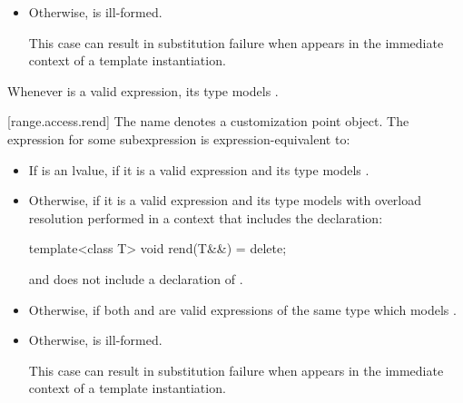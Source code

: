 \begin{addedblock}
\begin{itemize}
\item
  Otherwise,  is ill-formed.
  {\color{newclr}
  \begin{note}
  This case can result in substitution failure when 
  appears in the immediate context of a template instantiation.
  \end{note}
  } %
\end{itemize}

\pnum
\begin{note}
Whenever  is a valid expression, its type models
.
\end{note}

[range.access.rend]{}
\pnum
The name  denotes a customization point
object. The expression
 for some subexpression  is
expression-equivalent to:

\begin{itemize}
\item
  If  is an lvalue, 
  if it is a valid expression and its type  models
  .

\item
  Otherwise,  if it is a valid
  expression and its type  models
   with overload
  resolution performed in a context that includes the declaration:
  \begin{codeblock}
  template<class T> void rend(T&&) = delete;
  \end{codeblock}
  and does not include a declaration of .

\item
  Otherwise,  if both
   and  are valid
  expressions of the same type  which models
  .

\item
  Otherwise,  is ill-formed.
  {\color{newclr}
  \begin{note}
  This case can result in substitution failure when 
  appears in the immediate context of a template instantiation.
  \end{note}
  } %
\end{itemize}


\end{addedblock}
